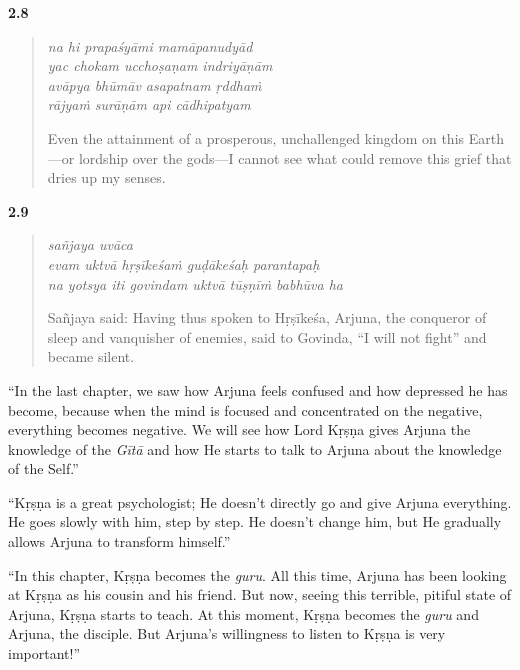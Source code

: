 \par\noindent\textbf{2.8}\par
\begin{verse}
\textit{na hi prapaśyāmi mamāpanudyād} \\
\textit{yac chokam ucchoṣaṇam indriyāṇām} \\
\textit{avāpya bhūmāv asapatnam ṛddhaṁ} \\
\textit{rājyaṁ surāṇām api cādhipatyam}

\noindent Even the attainment of a prosperous, unchallenged kingdom on this Earth---or lordship over the gods---I cannot see what could remove this grief that dries up my senses.
\end{verse}
\par



\par\noindent\textbf{2.9}\par
\begin{verse}
\textit{sañjaya uvāca} \\
\textit{evam uktvā hṛṣīkeśaṁ guḍākeśaḥ parantapaḥ} \\
\textit{na yotsya iti govindam uktvā tūṣṇīṁ babhūva ha}

\noindent Sañjaya said: Having thus spoken to Hṛṣīkeśa, Arjuna, the conqueror of sleep and vanquisher of enemies, said to Govinda, \enquote{I will not fight} and became silent.
\end{verse}
\par


\enquote{In the last chapter, we saw how Arjuna feels confused and how depressed he has become, because when the mind is focused and concentrated on the negative, everything becomes negative. We will see how Lord Kṛṣṇa gives Arjuna the knowledge of the \textit{Gītā} and how He starts to talk to Arjuna about the knowledge of the Self.}

\enquote{Kṛṣṇa is a great psychologist; He doesn’t directly go and give Arjuna everything. He goes slowly with him, step by step. He doesn’t change him, but He gradually allows Arjuna to transform himself.}

\enquote{In this chapter, Kṛṣṇa becomes the \textit{guru}. All this time, Arjuna has been looking at Kṛṣṇa as his cousin and his friend. But now, seeing this terrible, pitiful state of Arjuna, Kṛṣṇa starts to teach. At this moment, Kṛṣṇa becomes the \textit{guru} and Arjuna, the disciple. But Arjuna’s willingness to listen to Kṛṣṇa is very important!}

